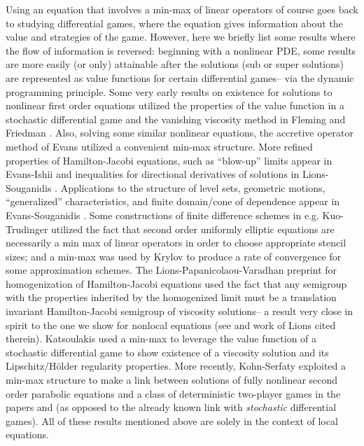 \documentclass[11pt,reqno]{amsart}
\numberwithin{equation}{section}
\theoremstyle{plain}
\begin{document}
Using an equation that involves a min-max of linear operators of course goes back to studying differential games, where the equation gives information about the value and strategies of the game.  However, here we briefly list some results where the flow of information is reversed: beginning with a nonlinear PDE, some results are more easily (or only) attainable after the solutions (sub or super solutions) are represented as value functions for certain differential games-- via the dynamic programming principle.  Some very early results on existence for solutions to nonlinear first order equations utilized the properties of the value function in a stochastic differential game and the vanishing viscosity method in Fleming \cite{Fleming-1969CauchyProbNonlinFirstOrder-UsesMinMax} and Friedman \cite{Friedman-1974TheCauchyProbFirstOrderEquations-IUMJ}.  Also, solving some similar nonlinear equations, the accretive operator method of Evans \cite{Evans-1980OnSolvingPDEAccretive}  utilized a convenient min-max structure.
More refined properties of Hamilton-Jacobi equations, such as ``blow-up'' limits appear in Evans-Ishii \cite{EvansIshii-1984DiffGamesNonlinearPDE-ManMath} and inequalities for directional derivatives of solutions in Lions-Souganidis \cite{LionsSouganidis-1985DiffGamesDerivOfSol}.    Applications to the structure of level sets, geometric motions, ``generalized'' characteristics, and finite domain/cone of dependence appear in Evans-Souganidis \cite{EvansSoug-84DiffGameRepresentation}.    Some constructions of finite difference schemes in e.g. Kuo-Trudinger \cite{KuoTru-2007NewMaxPrinciplesIUMJ} utilized the fact that second order uniformly elliptic equations are necessarily a min max of linear operators in order to choose appropriate stencil sizes; and a min-max was used by Krylov \cite{Krylov-2015RatesFinDiffIsaacs} to produce a rate of convergence for some approximation schemes.   The Lions-Papanicolaou-Varadhan preprint for homogenization of Hamilton-Jacobi equations \cite{LiPaVa-88unpublished} used the fact that any semigroup with the properties inherited by the homogenized limit must be a translation invariant Hamilton-Jacobi semigroup of viscosity solutions-- a result very close in spirit to the one we show for nonlocal equations (see \cite[Section 1.2]{LiPaVa-88unpublished} and work of Lions cited therein).  Katsoulakis \cite{Katsou-1995RepresentationDegParEq} used a min-max to leverage the value function of a stochastic differential game to show existence of a viscosity solution and its Lipschitz/H\"older regularity properties.  More recently, Kohn-Serfaty exploited a min-max structure to make a link between solutions of fully nonlinear second order parabolic equations and a class of deterministic two-player games in the papers \cite{KohnSerfaty-2006DeterministicGameMCM-CPAM} and \cite{KohnSerfaty-2010DeterministicGamesFullyNonlinearPDE-CPAM} (as opposed to the already known link with \emph{stochastic} differential games).   All of these results mentioned above are solely in the context of local equations.
\end{document}
